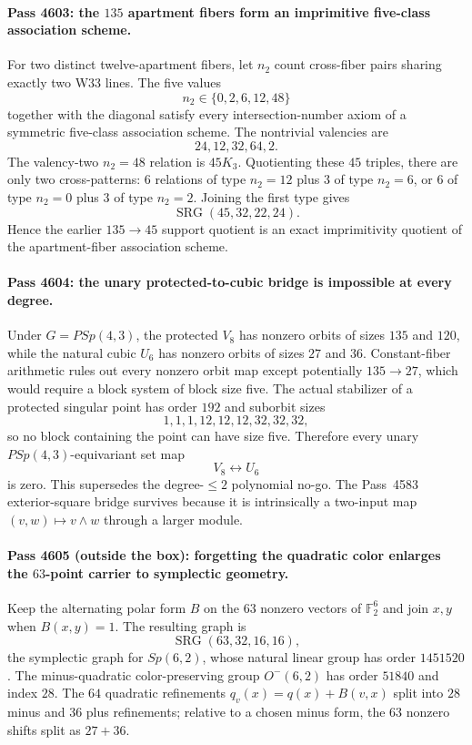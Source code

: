 \paragraph{Pass 4603: the $135$ apartment fibers form an imprimitive five-class association scheme.}
For two distinct twelve-apartment fibers, let $n_2$ count cross-fiber pairs
sharing exactly two W33 lines.  The five values
\[
 n_2\in\{0,2,6,12,48\}
\]
together with the diagonal satisfy every intersection-number axiom of a
symmetric five-class association scheme.  The nontrivial valencies are
\[
 \boxed{24,12,32,64,2.}
\]
The valency-two $n_2=48$ relation is $45K_3$.  Quotienting these $45$ triples,
there are only two cross-patterns: $6$ relations of type $n_2=12$ plus $3$ of
type $n_2=6$, or $6$ of type $n_2=0$ plus $3$ of type $n_2=2$.  Joining the
first type gives
\[
 \boxed{\operatorname{SRG}(45,32,22,24)}.
\]
Hence the earlier $135\to45$ support quotient is an exact imprimitivity quotient
of the apartment-fiber association scheme.

\paragraph{Pass 4604: the unary protected-to-cubic bridge is impossible at every degree.}
Under $G=PSp(4,3)$, the protected $V_8$ has nonzero orbits of sizes $135$ and
$120$, while the natural cubic $U_6$ has nonzero orbits of sizes $27$ and $36$.
Constant-fiber arithmetic rules out every nonzero orbit map except potentially
$135\to27$, which would require a block system of block size five.  The actual
stabilizer of a protected singular point has order $192$ and suborbit sizes
\[
 \boxed{1,1,1,12,12,12,32,32,32},
\]
so no block containing the point can have size five.  Therefore every unary
$PSp(4,3)$-equivariant set map
\[
 \boxed{V_8\longleftrightarrow U_6}
\]
is zero.  This supersedes the degree-$\le2$ polynomial no-go.  The Pass~4583
exterior-square bridge survives because it is intrinsically a two-input map
$(v,w)\mapsto v\wedge w$ through a larger module.

\paragraph{Pass 4605 (outside the box): forgetting the quadratic color enlarges the $63$-point carrier to symplectic geometry.}
Keep the alternating polar form $B$ on the $63$ nonzero vectors of
$\mathbb F_2^6$ and join $x,y$ when $B(x,y)=1$.  The resulting graph is
\[
 \boxed{\operatorname{SRG}(63,32,16,16)},
\]
the symplectic graph for $Sp(6,2)$, whose natural linear group has order
$1451520$.  The minus-quadratic color-preserving group $O^-(6,2)$ has order
$51840$ and index $28$.  The $64$ quadratic refinements
$q_v(x)=q(x)+B(v,x)$ split into $28$ minus and $36$ plus refinements; relative
to a chosen minus form, the $63$ nonzero shifts split as $27+36$.

